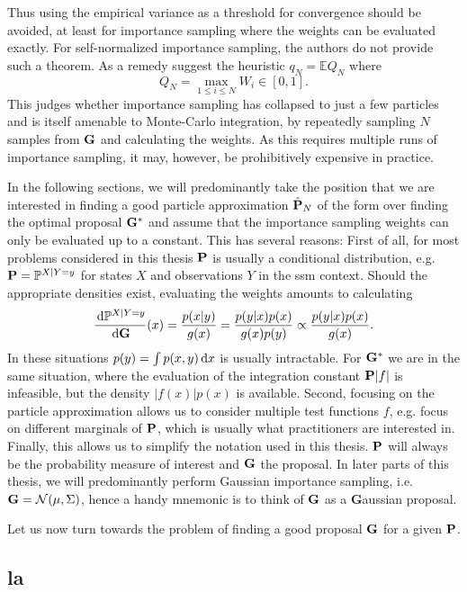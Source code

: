 Thus using the empirical variance as a threshold for convergence should be avoided, at least for importance sampling where the weights can be evaluated exactly. For self-normalized importance sampling, the authors do not provide such a theorem. As a remedy \citep{Chatterjee2018Sample} suggest the heuristic $q_{N} = \mathbb E Q_{N}$ where
$$
Q_{N} = \max_{1\leq i\leq N} W_{i} \in [0, 1].
$$
This judges whether importance sampling has collapsed to just a few particles and is itself amenable to Monte-Carlo integration, by repeatedly sampling $N$ samples from $\G$ and calculating the weights. 
As this requires multiple runs of importance sampling, it may, however, be prohibitively expensive in practice.

In the following sections, we will predominantly take the position that we are interested in finding a good particle approximation $\hat\P_{N}$ of the form  over finding the optimal proposal $\G^{\ast}$  and assume that the importance sampling weights can only be evaluated up to a constant. 
This has several reasons: First of all, for most problems considered in this thesis $\P$ is usually a conditional distribution, e.g. $\P = \mathbb P^{X|Y=y}$ for states $X$ and observations $Y$ in the \acrshort{ssm} context. Should the appropriate densities exist, evaluating the weights amounts to calculating 
$$
\rnd{\mathbb P^{X| Y= y}}{\G}(x) = \frac{p(x|y)}{g(x)} = \frac{p(y|x)p(x)}{g(x)p(y)} \propto \frac{p(y|x)p(x)}{g(x)}.
$$
In these situations $p(y) = \int p(x,y)\d x$ is usually intractable. For $\G^{\ast}$ we are in the same situation, where the evaluation of the integration constant $\P \lvert f \rvert$ is infeasible, but the density $\lvert f(x)\rvert p(x)$ is available.
Second, focusing on the particle approximation allows us to consider multiple test functions $f$, e.g. focus on different marginals of $\P$, which is usually what practitioners are interested in. 
Finally, this allows us to simplify the notation used in this thesis. $\P$ will always be the probability measure of interest and $\G$ the proposal. In later parts of this thesis, we will predominantly perform Gaussian importance sampling, i.e. $\G = \mathcal N(\mu, \Sigma)$, hence a handy mnemonic is to think of $\G$ as a \textbf{G}aussian proposal.

Let us now turn towards the problem of finding a good proposal $\G$ for a given $\P$. 

\subsection{\texorpdfstring{\Acrfull{la}}{Laplace approximation}}
\label{subsec:la}

